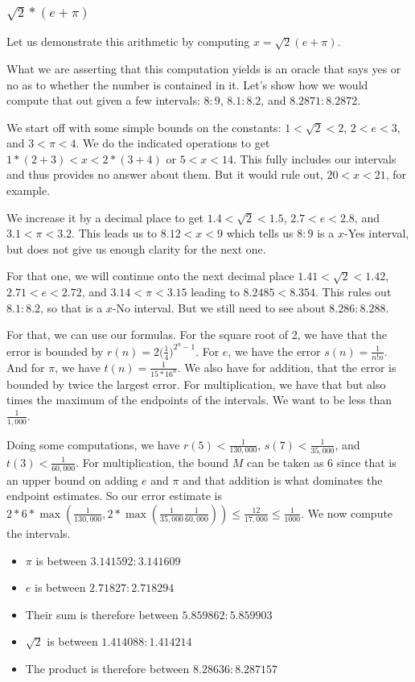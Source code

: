 \documentclass[12pt]{article}
\theoremstyle{remark}
\begin{document}
\subsubsection{$\sqrt{2}*(e + \pi)$}

Let us demonstrate this arithmetic by computing $x = \sqrt{2}(e + \pi)$. 

What we are asserting that this computation yields is an oracle that says yes or no as to whether the number is contained in it. Let's show how we would compute that out given a few intervals:  $8:9$, $8.1:8.2$, and $8.2871:8.2872$.

We start off with some simple bounds on the constants: $1 < \sqrt{2} < 2$, $2<e<3$, and $3 < \pi<4$. We do the indicated operations to get $1*(2+3) < x < 2*(3+4)$ or $5 < x< 14$. This fully includes our intervals and thus provides no answer about them. But it would rule out, $20 < x< 21$, for example. 

We increase it by a decimal place to get $1.4 < \sqrt{2} < 1.5$, $2.7<e<2.8$, and $3.1 < \pi<3.2$. This leads us to $8.12 < x < 9$ which tells us $8:9$ is a $x$-Yes interval, but does not give us enough clarity for the next one. 

For that one, we will continue onto the next decimal place $1.41 < \sqrt{2} < 1.42$, $2.71<e<2.72$, and $3.14 < \pi<3.15$ leading to $8.2485 < 8.354$. This rules out $8.1:8.2$, so that is a $x$-No interval. But we still need to see about $8.286:8.288$.

For that, we can use our formulas. For the square root of 2, we have that the error is bounded by $r(n) = 2\big(\frac{1}{4}\big)^{2^n-1}$. For $e$, we have the error $s(n) = \frac{1}{n!n}$. And for $\pi$, we have $t(n) = \frac{1}{15 * 16^n}$. We also have for addition, that the error is bounded by twice the largest error. For multiplication, we have that but also times the maximum of the endpoints of the intervals. We want to be less than $\frac{1}{1,000}$. 

Doing some computations, we have $r(5) < \frac{1}{130,000}$, $s(7) < \frac{1}{35,000}$, and $t(3) < \frac{1}{60,000}$. For multiplication, the bound $M$ can be taken as 6 since that is an upper bound on adding $e$ and $\pi$ and that addition is what dominates the endpoint estimates. So our error estimate is $2*6*\max(\frac{1}{130,000}, 2*\max(\frac{1}{35,000}\frac{1}{60,000})) \leq \frac{12}{17,000} \leq \frac{1}{1000}$. We now compute the intervals.  

\begin{itemize}
    \item $\pi$ is between $3.141592:3.141609$
    \item $e$ is between $2.71827:2.718294$
    \item Their sum is therefore between $5.859862:5.859903$
    \item $\sqrt{2}$ is between $1.414088:1.414214$
    \item The product is therefore between $8.28636:8.287157$
\end{itemize}
\end{document}
